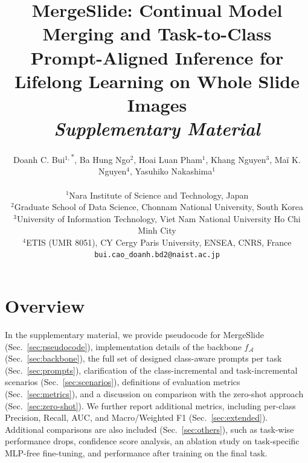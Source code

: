 \documentclass[10pt,twocolumn,letterpaper]{article}
\begin{document}
\renewcommand\thefigure{\thesection.\arabic{figure}}
\renewcommand\thetable{\thesection.\arabic{table}}
\renewcommand\thesection{\Alph{section}}

\title{MergeSlide: Continual Model Merging and Task-to-Class Prompt-Aligned Inference for Lifelong Learning on Whole Slide Images \\ \textit{Supplementary Material}}

\author{Doanh C. Bui$^{1,}$\textsuperscript{*}, Ba Hung Ngo$^2$, Hoai Luan Pham$^1$, Khang Nguyen$^3$, Ma\"{i} K. Nguyen$^4$, Yasuhiko Nakashima$^1$ \\
\\
$^1$Nara Institute of Science and Technology, Japan \\
$^2$Graduate School of Data Science, Chonnam National University, South Korea \\
$^3$University of Information Technology, Viet Nam National University Ho Chi Minh City \\
$^4$ETIS (UMR 8051), CY Cergy Paris University, ENSEA, CNRS, France \\
{\tt\small bui.cao\_doanh.bd2@naist.ac.jp}
}

\maketitle

\tableofcontents

\section{Overview}
\label{sec:overview}
In the supplementary material, we provide pseudocode for MergeSlide (Sec.~\ref{sec:pseudocode}), implementation details of the backbone $f_{\mathcal{A}}$ (Sec.~\ref{sec:backbone}), {the full set of designed class-aware prompts per task (Sec.~\ref{sec:prompts})}, clarification of the class-incremental and task-incremental scenarios (Sec.~\ref{sec:scenarios}), definitions of evaluation metrics (Sec.~\ref{sec:metrics}), and a discussion on comparison with the zero-shot approach (Sec.~\ref{sec:zero-shot}). {We further report additional metrics, including per-class Precision, Recall, AUC, and Macro/Weighted F1 (Sec.~\ref{sec:extended})}. Additional comparisons are also included (Sec.~\ref{sec:others}), such as task-wise performance drops, confidence score analysis, an ablation study on task-specific MLP-free fine-tuning, and performance after training on the final task.
\end{document}
